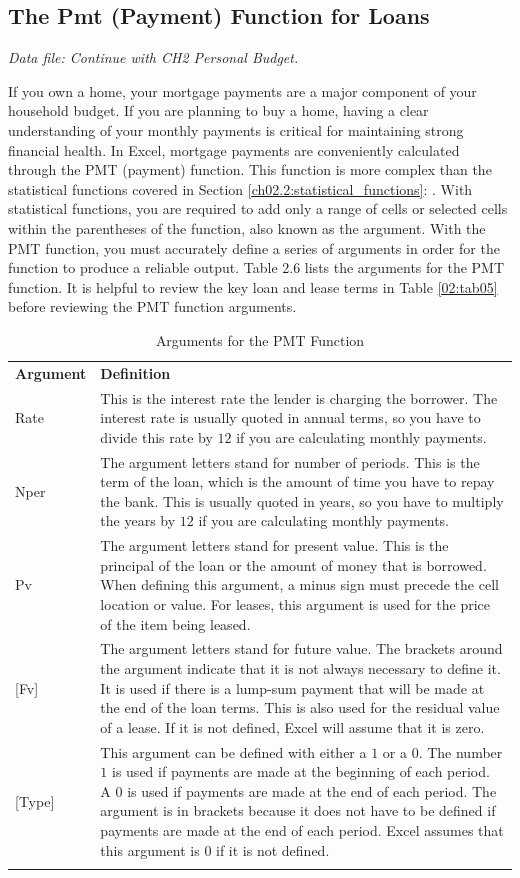 \subsection{The Pmt (Payment) Function for Loans}

\textit{Data file: Continue with CH2 Personal Budget.}

If you own a home, your mortgage payments are a major component of your household budget. If you are planning to buy a home, having a clear understanding of your monthly payments is critical for maintaining strong financial health. In Excel, mortgage payments are conveniently calculated through the PMT (payment) function. This function is more complex than the statistical functions covered in Section \ref{ch02.2:statistical_functions}: . With statistical functions, you are required to add only a range of cells or selected cells within the parentheses of the function, also known as the argument. With the PMT function, you must accurately define a series of arguments in order for the function to produce a reliable output. Table 2.6 lists the arguments for the PMT function. It is helpful to review the key loan and lease terms in Table \ref{02:tab05} before reviewing the PMT function arguments.

{\small
	\begin{longtable}{p{0.75in}p{3.5in}}
		\textbf{Argument} & \textbf{Definition}\endhead
		\hline \\
		Rate & This is the interest rate the lender is charging the borrower. The interest rate is usually quoted in annual terms, so you have to divide this rate by $ 12 $ if you are calculating monthly payments.\\
		Nper & The argument letters stand for number of periods. This is the term of the loan, which is the amount of time you have to repay the bank. This is usually quoted in years, so you have to multiply the years by $ 12 $ if you are calculating monthly payments.\\
		Pv & The argument letters stand for present value. This is the principal of the loan or the amount of money that is borrowed. When defining this argument, a minus sign must precede the cell location or value. For leases, this argument is used for the price of the item being leased.\\
		{[Fv]} & The argument letters stand for future value. The brackets around the argument indicate that it is not always necessary to define it. It is used if there is a lump-sum payment that will be made at the end of the loan terms. This is also used for the residual value of a lease. If it is not defined, Excel will assume that it is zero.\\
		{[Type]} & This argument can be defined with either a $ 1 $ or a $ 0 $. The number $ 1 $ is used if payments are made at the beginning of each period. A $ 0 $ is used if payments are made at the end of each period. The argument is in brackets because it does not have to be defined if payments are made at the end of each period. Excel assumes that this argument is $ 0 $ if it is not defined.\\
		\caption{Arguments for the PMT Function}
		\label{02:tab06}
	\end{longtable}
}


